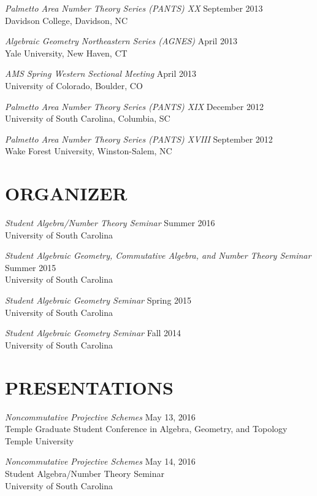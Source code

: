 \documentclass[line,overlapped]{res}
\begin{document}
\begin{resume}
         {\sl Palmetto Area Number Theory Series (PANTS) XX} \hfill September 2013\\
         Davidson College, Davidson, NC

         {\sl Algebraic Geometry Northeastern Series (AGNES)} \hfill April 2013\\
         Yale University, New Haven, CT

         {\sl AMS Spring Western Sectional Meeting} \hfill April 2013\\
         University of Colorado, Boulder, CO

         {\sl Palmetto Area Number Theory Series (PANTS) XIX} \hfill December 2012\\
         University of South Carolina, Columbia, SC

         {\sl Palmetto Area Number Theory Series (PANTS) XVIII} \hfill September 2012\\
         Wake Forest University, Winston-Salem, NC

\newpage
\section{ORGANIZER}
         {\sl Student Algebra/Number Theory Seminar} \hfill Summer 2016\\
	 University of South Carolina
         
	 {\sl Student Algebraic Geometry, Commutative Algebra, and Number Theory Seminar} \hfill Summer 2015\\
	 University of South Carolina
	 
         {\sl Student Algebraic Geometry Seminar} \hfill Spring 2015\\
	 University of South Carolina

         {\sl Student Algebraic Geometry Seminar} \hfill Fall 2014\\
	 University of South Carolina
        
 \section{PRESENTATIONS}
         {\sl Noncommutative Projective Schemes} \hfill May 13, 2016\\
         Temple Graduate Student Conference in Algebra, Geometry, and Topology\\
         Temple University

         {\sl Noncommutative Projective Schemes} \hfill May 14, 2016\\
         Student Algebra/Number Theory Seminar\\
         University of South Carolina


\end{resume}
\end{document}
